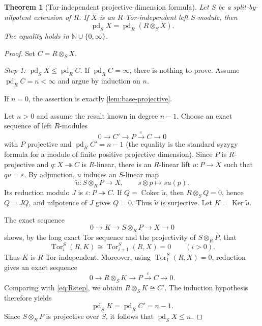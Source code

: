 \documentclass[11pt,reqno]{amsart}
\newcommand{\pd}{\operatorname{pd}}
\newcommand{\Tor}{\operatorname{Tor}}
\newcommand{\Coker}{\operatorname{Coker}}
\newcommand{\Ker}{\operatorname{Ker}}
\theoremstyle{plain}
\newtheorem{theorem}{Theorem}[section]
\theoremstyle{definition}
\theoremstyle{remark}
\begin{document}
\begin{theorem}[Tor-independent projective-dimension formula]\label{thm:tor-pd}
Let $S$ be a split-by-nilpotent extension of $R$.  If $X$ is an
$R$-Tor-independent left $S$-module, then
\begin{equation}\label{eq:tor-pd}
   {\ \pd_SX=\pd_R(R\otimes_SX).\ }
\end{equation}
The equality holds in $\mathbb N\cup\{0,\infty\}$.
\end{theorem}

\begin{proof}
Set $C=R\otimes_SX$.

\smallskip
\noindent\emph{Step 1: $\pd_SX\le\pd_RC$.}
If $\pd_RC=\infty$, there is nothing to prove.  Assume
$\pd_RC=n<\infty$ and argue by induction on $n$.

If $n=0$, the assertion is exactly \cref{lem:base-projective}.

Let $n>0$ and assume the result known in degree $n-1$.  Choose an exact sequence
of left $R$-modules
\begin{equation}\label{eq:Rstep}
 0\longrightarrow C'\longrightarrow P\xrightarrow{\varepsilon}C
 \longrightarrow0
\end{equation}
with $P$ projective and $\pd_RC'=n-1$ (the equality is the standard syzygy formula for a module of finite positive projective dimension).  Since $P$ is $R$-projective and
$q:X\twoheadrightarrow C$ is $R$-linear, there is an $R$-linear lift
$u:P\to X$ such that $qu=\varepsilon$.  By adjunction, $u$ induces an
$S$-linear map
\[
 \widetilde u:S\otimes_RP\longrightarrow X,
 \qquad s\otimes p\longmapsto su(p).
\]
Its reduction modulo $J$ is $\varepsilon:P\twoheadrightarrow C$.  If
$Q=\Coker\widetilde u$, then $R\otimes_SQ=0$, hence $Q=JQ$, and nilpotence of
$J$ gives $Q=0$.  Thus $\widetilde u$ is surjective.  Let
$K=\Ker\widetilde u$.

The exact sequence
\[
 0\longrightarrow K\longrightarrow S\otimes_RP
 \longrightarrow X\longrightarrow0
\]
shows, by the long exact Tor sequence and the projectivity of $S\otimes_RP$, that
\[
 \Tor_i^S(R,K)\cong\Tor_{i+1}^S(R,X)=0
 \qquad(i>0).
\]
Thus $K$ is $R$-Tor-independent.  Moreover, using
$\Tor_1^S(R,X)=0$, reduction gives an exact sequence
\[
 0\longrightarrow R\otimes_SK\longrightarrow P
 \xrightarrow{\varepsilon}C\longrightarrow0.
\]
Comparing with \eqref{eq:Rstep}, we obtain
$R\otimes_SK\cong C'$.  The induction hypothesis therefore yields
\[
  \pd_SK=\pd_RC'=n-1.
\]
Since $S\otimes_RP$ is projective over $S$, it follows that
$\pd_SX\le n$.


\end{proof}
\end{document}
